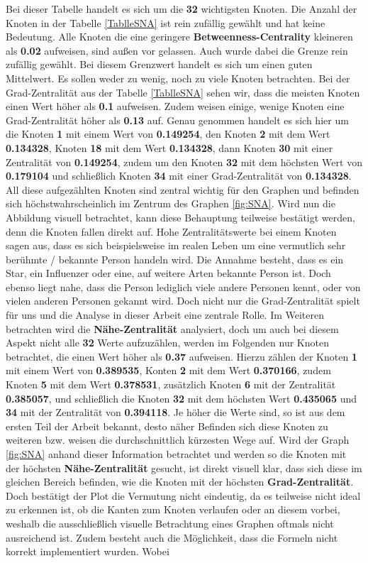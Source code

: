 \newpage
Bei dieser Tabelle handelt es sich um die \textbf{32} wichtigsten Knoten. Die Anzahl der Knoten in der Tabelle \ref{TablleSNA} ist rein zufällig gewählt und hat keine Bedeutung. Alle Knoten die eine geringere \textbf{Betweenness-Centrality} kleineren als \textbf{0.02} aufweisen, sind außen vor gelassen. Auch wurde dabei die Grenze rein zufällig gewählt. Bei diesem Grenzwert handelt es sich um einen guten Mittelwert. Es sollen weder zu wenig, noch zu viele Knoten betrachten.
Bei der Grad-Zentralität aus der Tabelle \ref{TablleSNA} sehen wir, dass die meisten Knoten einen Wert höher als \textbf{0.1} aufweisen. Zudem weisen einige, wenige Knoten eine Grad-Zentralität höher als \textbf{0.13} auf. Genau genommen handelt es sich hier um die Knoten \textbf{1} mit einem Wert von \textbf{0.149254}, den Knoten \textbf{2} mit dem Wert \textbf{0.134328}, Knoten \textbf{18} mit dem Wert \textbf{0.134328}, dann Knoten \textbf{30} mit einer Zentralität von \textbf{0.149254}, zudem um den Knoten \textbf{32} mit dem höchsten Wert von \textbf{0.179104} und schließlich Knoten \textbf{34} mit einer Grad-Zentralität von \textbf{0.134328}. All diese aufgezählten Knoten sind zentral wichtig für den Graphen und befinden sich höchstwahrscheinlich im Zentrum des Graphen \ref{fig:SNA}. Wird nun die Abbildung visuell betrachtet, kann diese Behauptung teilweise bestätigt werden, denn die Knoten fallen direkt auf. Hohe Zentralitätswerte bei einem Knoten sagen aus, dass es sich beispielsweise im realen Leben um eine vermutlich sehr berühmte / bekannte Person handeln wird. Die Annahme besteht, dass es ein Star, ein Influenzer oder eine, auf weitere Arten bekannte Person ist. Doch ebenso liegt nahe, dass die Person lediglich viele andere Personen kennt, oder von vielen anderen Personen gekannt wird. Doch nicht nur die Grad-Zentralität spielt für uns und die Analyse in dieser Arbeit eine zentrale Rolle. Im Weiteren betrachten wird die \textbf{Nähe-Zentralität}  analysiert, doch um auch bei diesem Aspekt nicht alle \textbf{32} Werte aufzuzählen, werden im Folgenden nur Knoten betrachtet, die einen Wert höher als \textbf{0.37} aufweisen. Hierzu zählen der Knoten \textbf{1} mit einem Wert von \textbf{0.389535}, Konten \textbf{2} mit dem Wert \textbf{0.370166}, zudem Knoten \textbf{5} mit dem Wert \textbf{0.378531}, zusätzlich Knoten \textbf{6} mit der Zentralität \textbf{0.385057}, und schließlich die Knoten \textbf{32} mit dem höchsten Wert \textbf{0.435065} und \textbf{34} mit der Zentralität von \textbf{0.394118}. Je höher die Werte sind, so ist aus dem ersten Teil der Arbeit bekannt, desto näher Befinden sich diese Knoten zu weiteren bzw. weisen die durchschnittlich kürzesten Wege auf. Wird der Graph \ref{fig:SNA} anhand dieser Information betrachtet und werden so die Knoten mit der höchsten \textbf{Nähe-Zentralität} gesucht, ist direkt visuell klar, dass sich diese im gleichen Bereich befinden, wie die Knoten mit der höchsten \textbf{Grad-Zentralität}. Doch bestätigt der Plot die Vermutung nicht eindeutig, da es teilweise nicht ideal zu erkennen ist, ob die Kanten zum Knoten verlaufen oder an diesem vorbei, weshalb die ausschließlich visuelle Betrachtung eines Graphen oftmals nicht ausreichend ist. Zudem besteht auch die Möglichkeit, dass die Formeln nicht korrekt implementiert wurden. Wobei 